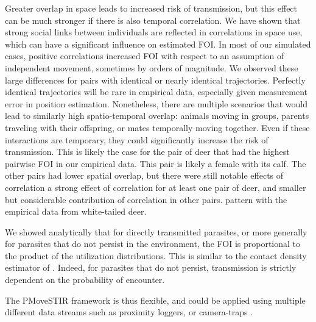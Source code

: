\documentclass[letterpaper]{article}
\begin{document}
Greater overlap in space leads to increased risk of transmission, but this effect can be much stronger if there is also temporal correlation. We have shown that strong social links between individuals are reflected in correlations in space use, which can have a significant influence on estimated FOI. In most of our simulated cases, positive correlations increased FOI with respect to an assumption of independent movement, sometimes by orders of magnitude. We observed these large differences for pairs with identical or nearly identical trajectories. Perfectly identical trajectories will be rare in empirical data, especially given measurement error in position estimation. Nonetheless, there are multiple scenarios that would lead to similarly high spatio-temporal overlap: animals moving in groups, parents traveling with their offspring, or mates temporally moving together. Even if these interactions are temporary, they could significantly increase the risk of transmission. 
This is likely the case for the pair of deer that had the highest pairwise FOI in our empirical data. This pair is likely a female with its calf. The other pairs had lower spatial overlap, but there were still notable effects of correlation
a strong effect of correlation for at least one pair of deer, and smaller but considerable contribution of correlation in other pairs.  pattern with the empirical data from white-tailed deer. 

We showed analytically that for directly transmitted parasites, or more generally for parasites that do not persist in the environment, the FOI is proportional to the product of the utilization distributions. This is similar to the contact density estimator of \citet{Noonan2021}. Indeed, for parasites that do not persist, transmission is strictly dependent on the probability of encounter.

 
The PMoveSTIR framework is thus flexible, and could be applied using multiple different data streams such as proximity loggers, or camera-traps \citep{Wilber2022}.
\end{document}
